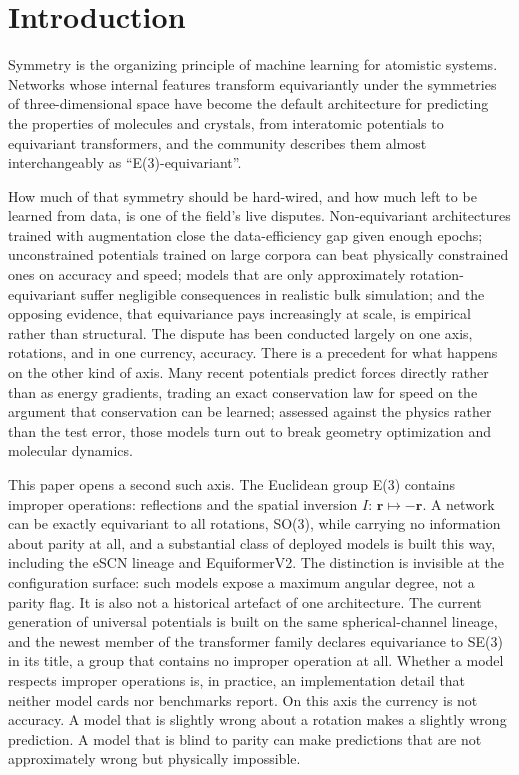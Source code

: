 \section*{Introduction}

Symmetry is the organizing principle of machine learning for atomistic systems. Networks whose internal features transform equivariantly under the symmetries of three-dimensional space have become the default architecture for predicting the properties of molecules and crystals, from interatomic potentials\cite{batzner2022nequip,musaelian2023allegro,batatia2022mace} to equivariant transformers\cite{liao2023equiformer,liao2024equiformerv2}, and the community describes them almost interchangeably as ``E(3)-equivariant''.

How much of that symmetry should be hard-wired, and how much left to be learned from data, is one of the field's live disputes\cite{creed2026six}. Non-equivariant architectures trained with augmentation close the data-efficiency gap given enough epochs\cite{brehmer2024scale}; unconstrained potentials trained on large corpora can beat physically constrained ones on accuracy and speed\cite{bigi2026unconstrained}; models that are only approximately rotation-equivariant suffer negligible consequences in realistic bulk simulation\cite{langer2024broken}; and the opposing evidence, that equivariance pays increasingly at scale, is empirical rather than structural\cite{ngo2025scaling}. The dispute has been conducted largely on one axis, rotations, and in one currency, accuracy. There is a precedent for what happens on the other kind of axis. Many recent potentials predict forces directly rather than as energy gradients, trading an exact conservation law for speed on the argument that conservation can be learned; assessed against the physics rather than the test error, those models turn out to break geometry optimization and molecular dynamics\cite{bigi2025forces}.

This paper opens a second such axis. The Euclidean group E(3) contains improper operations: reflections and the spatial inversion $I\colon\, \mathbf{r} \mapsto -\mathbf{r}$. A network can be exactly equivariant to all rotations, SO(3), while carrying no information about parity at all, and a substantial class of deployed models is built this way, including the eSCN lineage\cite{passaro2023escn} and EquiformerV2. The distinction is invisible at the configuration surface: such models expose a maximum angular degree, not a parity flag. It is also not a historical artefact of one architecture. The current generation of universal potentials is built on the same spherical-channel lineage\cite{fu2025esen,wood2025uma}, and the newest member of the transformer family declares equivariance to SE(3) in its title\cite{equiformerv3}, a group that contains no improper operation at all. Whether a model respects improper operations is, in practice, an implementation detail that neither model cards nor benchmarks report. On this axis the currency is not accuracy. A model that is slightly wrong about a rotation makes a slightly wrong prediction. A model that is blind to parity can make predictions that are not approximately wrong but physically impossible.

